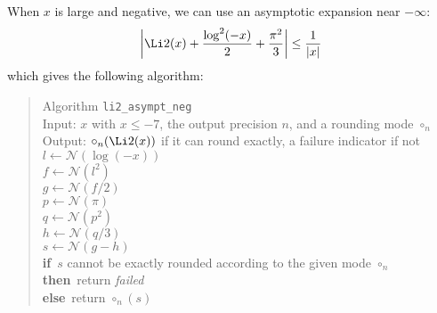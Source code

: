 \documentclass[12pt]{amsart}
\def\N{{\mathcal N}}
\def\If{{\bf if}}
\def\then{{\bf then}}
\def\Else{{\bf else}}
\begin{document}
When $x$ is large and negative, we can use an asymptotic expansion near 
$-\infty$:
\[
\left|\Li2(x) + \frac{\log^2(-x)}{2} + \frac{\pi^2}{3}\right| \leq 
\frac{1}{|x|}
\]
which gives the following algorithm:
\begin{quote}
  Algorithm {\tt li2\_asympt\_neg}\\
  Input: $x$ with $x \leq -7$, the output precision $n$, and a rounding mode
  $\circ_n$ \\
  Output: $\circ_n(\Li2(x))$ if it can round exactly, a failure indicator
  if not\\
  $l \leftarrow \N(\log(-x))$ \\
  $f \leftarrow \N(l^2)$\\
  $g \leftarrow \N(f/2)$\\
  $p \leftarrow \N(\pi)$\\
  $q \leftarrow \N(p^2)$\\
  $h \leftarrow \N(q/3)$\\
  $s \leftarrow \N(g-h)$\\
  \If\ $s$ cannot be exactly rounded according to the given mode $\circ_n$\\
  \then\ return {\em failed}\\
  \Else\ return $\circ_n(s)$
\end{quote}
\end{document}
